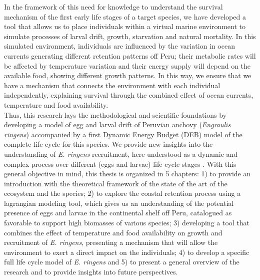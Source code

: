 In the framework of this need for knowledge to understand the survival mechanism of the first early life stages of a target species, we have developed a tool that allows us to place individuals within a virtual marine environment to simulate processes of larval drift, growth, starvation and natural mortality. In this simulated environment, individuals are influenced by the variation in ocean currents generating different retention patterns off Peru; their metabolic rates will be affected by temperature variation and their energy supply will depend on the available food, showing different growth patterns. In this way, we ensure that we have a mechanism that connects the environment with each individual independently, explaining survival through the combined effect of ocean currents, temperature and food availability.\\

Thus, this research lays the methodological and scientific foundations by developing a model of egg and larval drift of Peruvian anchovy (\textit{Engraulis ringens}) accompanied by a first Dynamic Energy Budget (DEB) model of the complete life cycle for this species. We provide new insights into the understanding of \textit{E. ringens} recruitment, here understood as a dynamic and complex process
over different (eggs and larvae) life cycle stages \citep{DuffBail2005}. With this general objective in mind, this thesis is organized in 5 chapters: 1) to provide an introduction with the theoretical framework of the state of the art of the ecosystem and the species; 2) to explore the coastal retention process using a lagrangian modeling tool, which gives us an understanding of the potential presence of eggs and larvae in the continental shelf off Peru, catalogued as favorable to support high biomasses of various species; 3) developing a tool that combines the effect of temperature and food availability on growth and recruitment of \textit{E. ringens}, presenting a mechanism that will allow the environment to exert a direct impact on the individuals; 4) to develop a specific full life cycle model of \textit{E. ringens} and 5) to present a general overview of the research and to provide insights into future perspectives.\\
